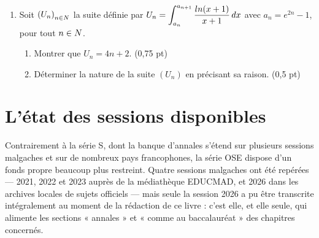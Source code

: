 \begin{enumerate}[label=\textbf{\arabic*.}, leftmargin=*, itemsep=0.3em]
        \begin{enumerate}[label=\textbf{\alph*)}, leftmargin=1.4em]
          \item Montrer que $h$ admet une fonction réciproque $h^{-1}$ sur un
                intervalle $J$ que l'on déterminera. \hfill\textup{(0,75 pt)}
          \item Dresser le tableau de variation de $h^{-1}$ sur $J$.
                \hfill\textup{(0,5 pt)}
          \item Calculer $h(0)$ et $\left(h^{-1}\right)'(0)$.
                \hfill\textup{(0,75 pt)}
          \item Tracer dans le même repère que $(C)$ la courbe représentative
                $(C^{-1})$ de la fonction réciproque $h^{-1}$ de $h$.
                \hfill\textup{(0,5 pt)}
        \end{enumerate}
  \item Soit $\left(U_{n}\right)_{n\in N}$ la suite définie par
        $U_{n} = \displaystyle\int_{a_{n}}^{a_{n+1}}\dfrac{ln(x+1)}{x+1}\,dx$
        avec $a_{n} = e^{2n}-1$, pour tout $n\in N$.
        \begin{enumerate}[label=\textbf{\alph*)}, leftmargin=1.4em]
          \item Montrer que $U_{n} = 4n+2$. \hfill\textup{(0,75 pt)}
          \item Déterminer la nature de la suite $\left(U_{n}\right)$ en
                précisant sa raison. \hfill\textup{(0,5 pt)}
        \end{enumerate}
\end{enumerate}

\section*{L'état des sessions disponibles}

Contrairement à la série S, dont la banque d'annales s'étend sur plusieurs
sessions malgaches et sur de nombreux pays francophones, la série OSE dispose
d'un fonds propre beaucoup plus restreint. Quatre sessions malgaches ont été
repérées — 2021, 2022 et 2023 auprès de la médiathèque EDUCMAD, et 2026 dans
les archives locales de sujets officiels — mais seule la session 2026 a pu
être transcrite intégralement au moment de la rédaction de ce livre : c'est
elle, et elle seule, qui alimente les sections « annales » et « comme au
baccalauréat » des chapitres concernés.

